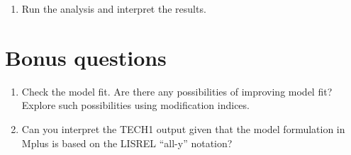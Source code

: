 \documentclass[
]{book}
\providecommand{\tightlist}{%
  \setlength{\itemsep}{0pt}\setlength{\parskip}{0pt}}
\begin{document}
\begin{enumerate}
\def\labelenumi{\arabic{enumi}.}
\setcounter{enumi}{2}
\tightlist
\item
  Run the analysis and interpret the results.
\end{enumerate}

\hypertarget{bonus-questions-2}{%
\section{Bonus questions}\label{bonus-questions-2}}

\begin{enumerate}
\def\labelenumi{\arabic{enumi}.}
\item
  Check the model fit. Are there any possibilities of improving model fit? Explore such possibilities using modification indices.
\item
  Can you interpret the TECH1 output given that the model formulation in Mplus is based on the LISREL ``all-y'' notation?
\end{enumerate}

  
\end{document}
